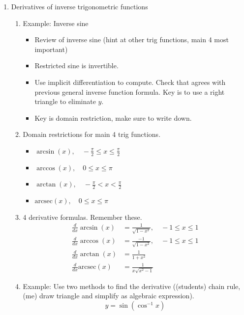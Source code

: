 \documentclass{article}
\begin{document}
\begin{enumerate}
\item Derivatives of inverse trigonometric functions
\begin{enumerate}
\item Example: Inverse sine
\begin{itemize}
\item Review of inverse sine (hint at other trig functions, main 4 most important)
\item Restricted sine is invertible.
\item Use implicit differentiation to compute. Check that agrees with previous general inverse function formula. Key is to use a right triangle to eliminate $y$.
\item Key is domain restriction, make sure to write down.
\end{itemize}
\item Domain restrictions for main 4 trig functions.
\begin{itemize}
\item $\arcsin(x), \quad -\frac{\pi}{2} \leq x \leq \frac{\pi}{2}$
\item $\arccos(x), \quad 0 \leq x \leq \pi$
\item $\arctan(x), \quad -\frac{\pi}{2} < x < \frac{\pi}{2}$
\item $\text{arcsec}(x), \quad 0 \leq x \leq \pi$
\end{itemize}
\item 4 derivative formulas. Remember these.
\begin{align*}
\frac{d}{dx} \arcsin(x) &= \frac{1}{\sqrt{1-x^2}}, \quad -1 \leq x \leq 1 \\
\frac{d}{dx} \arccos(x) &= \frac{-1}{\sqrt{1-x^2}}, \quad -1 \leq x \leq 1 \\
\frac{d}{dx} \arctan(x) &= \frac{1}{1+x^2} \\
\frac{d}{dx} \text{arcsec}(x) &= \frac{1}{x\sqrt{x^2-1}}
\end{align*}
\item Example: Use two methods to find the derivative ((students) chain rule, (me) draw triangle and simplify as algebraic expression).
$$
y = \sin(\cos^{-1} x)
$$
\end{enumerate}

\end{enumerate}


\end{document}
